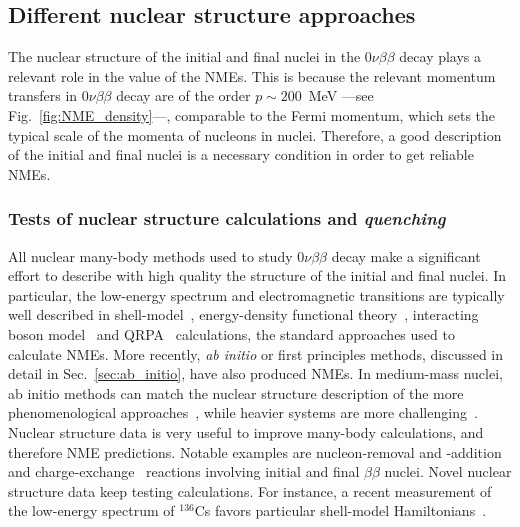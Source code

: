 \subsection{Different nuclear structure approaches}
\label{subsec:manybody}

The nuclear structure of the initial and final nuclei in the $0\nu\beta\beta$ decay plays a relevant role in the value of the NMEs. This is because the relevant momentum transfers in $0\nu\beta\beta$ decay are of the order $p\sim200$~MeV  ---see Fig.~\ref{fig:NME_density}---, comparable to the Fermi momentum, which sets the typical scale of the momenta of nucleons in nuclei. Therefore, a good description of the initial and final nuclei is a necessary condition in order to get reliable NMEs.

\subsubsection{Tests of nuclear structure calculations and {\it quenching}}

All nuclear many-body methods used to study $0\nu\beta\beta$ decay make a significant effort to describe with high quality the structure of the initial and final nuclei. In particular, the low-energy spectrum and electromagnetic transitions are typically well described in shell-model~\cite{Menendez:2009xa,Horoi:2015tkc,Iwata:2016cxn,Coraggio:2020hwx,Coraggio:2022vgy,Tsunoda:2023fqw}, energy-density functional theory~\cite{Yao:2021wst}, interacting boson model~\cite{Kotila:2016pib} and QRPA~\cite{Gimeno:2023dxx} calculations, the standard approaches used to calculate NMEs. More recently, {\it ab initio} or first principles methods, discussed in detail in Sec.~\ref{sec:ab_initio}, have also produced NMEs. In medium-mass nuclei, ab initio methods can match the nuclear structure description of the more phenomenological approaches~\cite{Yao:2020olm,Novario:2020dmr,Belley:2020ejd}, while heavier systems are more challenging~\cite{Belley:2020ejd}.
%
Nuclear structure data is very useful to improve many-body calculations, and therefore NME predictions. Notable examples are nucleon-removal and -addition~\cite{Freeman:2012hr,Freeman:2017bak,Szwec:2016fxr} and charge-exchange~\cite{Frekers:2018edj} reactions involving initial and final $\beta\beta$ nuclei. Novel nuclear structure data keep testing calculations. For instance, a recent measurement of the low-energy spectrum of $^{136}$Cs favors particular shell-model Hamiltonians~\cite{Rebeiro:2023kvs}.

